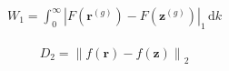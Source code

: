 \documentclass[12pt]{article}
\begin{document}
\begin{align*}
	W_1 = \int_{0}^{\infty} \left| F\left(\mathbf{r}^{(g)}\right) - F\left(\mathbf{z}^{(g)}\right) \right|_1 \, \mathrm{d}k
\end{align*}

\begin{align*}
	D_2 = \left\| f(\mathbf{r}) - f(\mathbf{z}) \right\|_2
\end{align*}
\end{document}
